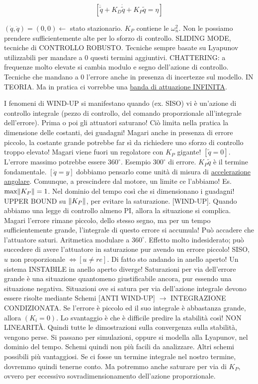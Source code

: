 \[
	[\ddot{\tilde{q}} + K_D\dot{\tilde{q}} + K_P\tilde{q} = \eta]
\]

$(\dot{q},\ddot{q})=(0,0)\leftarrow$ stato stazionario. $K_P$ contiene le $\omega_n^2$. Non le possiamo prendere sufficientemente alte per lo sforzo di controllo. SLIDING MODE, tecniche di CONTROLLO ROBUSTO. Tecniche sempre basate su Lyapunov utilizzabili per mandare a 0 questi termini aggiuntivi. CHATTERING: a frequenze molto elevate si cambia modulo e segno dell'azione di controllo. Tecniche che mandano a 0 l'errore anche in presenza di incertezze sul modello. IN TEORIA. Ma in pratica ci vorrebbe una \underline{banda di attuazione INFINITA}.

I fenomeni di WIND-UP si manifestano quando (ex. SISO) vi è un'azione di controllo integrale (pezzo di controllo, del comando proporzionale all'integrale dell'errore). Prima o poi gli attuatori saturano! Ciò limita nella pratica la dimensione delle costanti, dei guadagni! Magari anche in presenza di errore piccolo, la costante grande potrebbe far sì da richiedere uno sforzo di controllo troppo elevato! Magari viene fuori un regolatore con $K_P$ gigante! $[\tilde{q}=0]$. L'errore massimo potrebbe essere $360^{\circ}$. Esempio $300^{\circ}$ di errore. $K_P\tilde{q}$ è il termine fondamentale. $[\ddot{q}=y]$ dobbiamo pensarlo come unità di misura di \underline{accelerazione angolare}. Comunque, a prescindere dal motore, un limite ce l'abbiamo! Es. $\max\lVert K_P\rVert=1$. Nel dominio del tempo  così che si dimensionano i guadagni! UPPER BOUND su $\lVert K_P\rVert$, per evitare la saturazione. [WIND-UP]. Quando abbiamo una legge di controllo almeno PI, allora la situazione si complica. Magari l'errore rimane piccolo, dello stesso segno, ma per un tempo sufficientemente grande, l'integrale di questo errore si accumula! Può accadere che l'attuatore saturi. Aritmetica modulare a $360^{\circ}$. Effetto molto indesiderato; può succedere di avere l'attuatore in saturazione pur avendo un errore piccolo! SISO, $u$ non proporzionale $\iff[u\neq re]$. Di fatto sto andando in anello aperto! Un sistema INSTABILE in anello aperto diverge! Saturazioni per via dell'errore grande è una situazione quantomeno giustificabile ancora, pur essendo una situazione negativa. Situazioni ove si satura per via dell'azione integrale devono essere risolte mediante Schemi [ANTI WIND-UP] $\rightarrow$ INTEGRAZIONE CONDIZIONATA. Se l'errore è piccolo ed il suo integrale è abbastanza grande, allora $(K_i=0)$. Lo svantaggio è che è difficile predire la stabilità così! NON LINEARIT\`A. Quindi tutte le dimostrazioni sulla convergenza sulla stabilità, vengono perse. Si passano per simulazioni, oppure si modella alla Lyapunov, nel dominio del tempo. Schemi quindi non più facili da analizzare. Altri schemi possibili più vantaggiosi. Se ci fosse un termine integrale nel nostro termine, dovremmo quindi tenerne conto. Ma potremmo anche saturare per via di $K_P$, ovvero per eccessivo sovradimensionamento dell'azione proporzionale.

